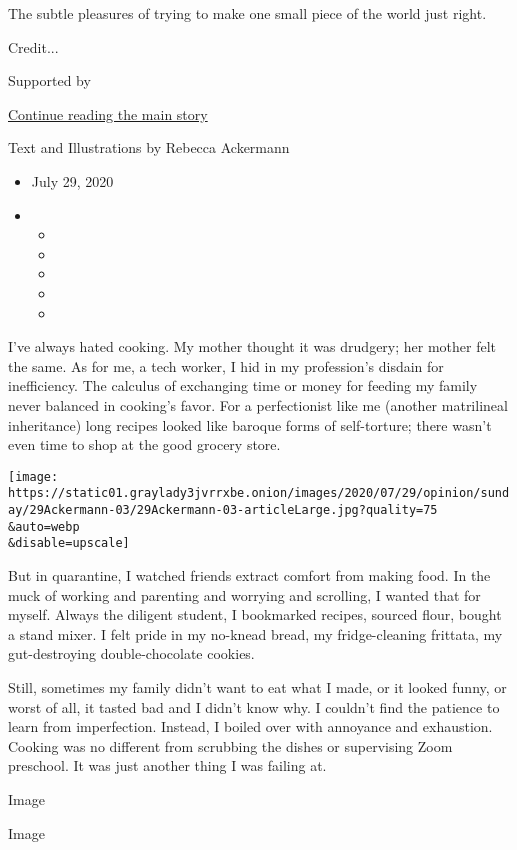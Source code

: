 The subtle pleasures of trying to make one small piece of the world just
right.

Credit...

Supported by

\protect\hyperlink{after-sponsor}{Continue reading the main story}

Text and Illustrations by Rebecca Ackermann

\begin{itemize}
\item
  July 29, 2020
\item
  \begin{itemize}
  \item
  \item
  \item
  \item
  \item
  \end{itemize}
\end{itemize}

I've always hated cooking. My mother thought it was drudgery; her mother
felt the same. As for me, a tech worker, I hid in my profession's
disdain for inefficiency. The calculus of exchanging time or money for
feeding my family never balanced in cooking's favor. For a perfectionist
like me (another matrilineal inheritance) long recipes looked like
baroque forms of self-torture; there wasn't even time to shop at the
good grocery store.

\texttt{[image: https://static01.graylady3jvrrxbe.onion/images/2020/07/29/opinion/sunday/29Ackermann-03/29Ackermann-03-articleLarge.jpg?quality=75\\\&auto=webp\\\&disable=upscale]}

But in quarantine, I watched friends extract comfort from making food.
In the muck of working and parenting and worrying and scrolling, I
wanted that for myself. Always the diligent student, I bookmarked
recipes, sourced flour, bought a stand mixer. I felt pride in my
no-knead bread, my fridge-cleaning frittata, my gut-destroying
double-chocolate cookies.

Still, sometimes my family didn't want to eat what I made, or it looked
funny, or worst of all, it tasted bad and I didn't know why. I couldn't
find the patience to learn from imperfection. Instead, I boiled over
with annoyance and exhaustion. Cooking was no different from scrubbing
the dishes or supervising Zoom preschool. It was just another thing I
was failing at.

Image

Image

